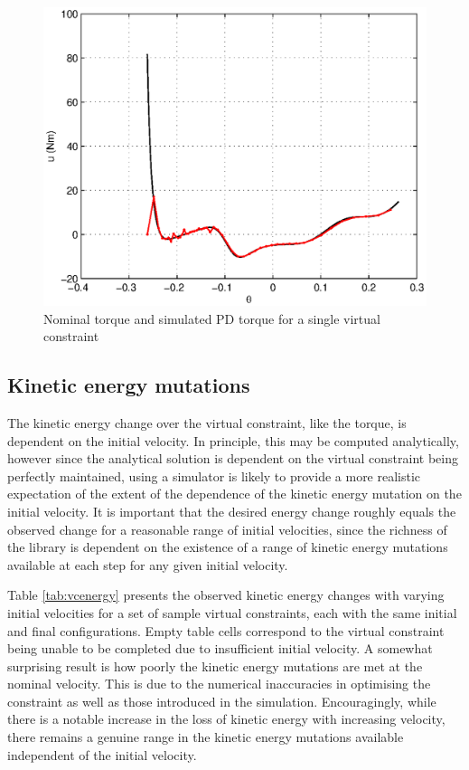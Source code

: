 \begin{figure}
\centering
\includegraphics[width=0.8\linewidth]{7Results/pdmatchesnom}
\caption{Nominal torque and simulated PD torque for a single virtual constraint}
\label{fig:pdmatchesnom}
\end{figure}


\subsection{Kinetic energy mutations}
The kinetic energy change over the virtual constraint, like the torque, is dependent on the initial velocity. In principle, this may be computed analytically, however since the analytical solution is dependent on the virtual constraint being perfectly maintained, using a simulator is likely to provide a more realistic expectation of the extent of the dependence of the kinetic energy mutation on the initial velocity. It is important that the desired energy change roughly equals the observed change for a reasonable range of initial velocities, since the richness of the library is dependent on the existence of a range of kinetic energy mutations available at each step for any given initial velocity.

Table \ref{tab:vcenergy} presents the observed kinetic energy changes with varying initial velocities for a set of sample virtual constraints, each with the same initial and final configurations. Empty table cells correspond to the virtual constraint being unable to be completed due to insufficient initial velocity. A somewhat surprising result is how poorly the kinetic energy mutations are met at the nominal velocity. This is due to the numerical inaccuracies in optimising the constraint as well as those introduced in the simulation. Encouragingly, while there is a notable increase in the loss of kinetic energy with increasing velocity, there remains a genuine range in the kinetic energy mutations available independent of the initial velocity.

